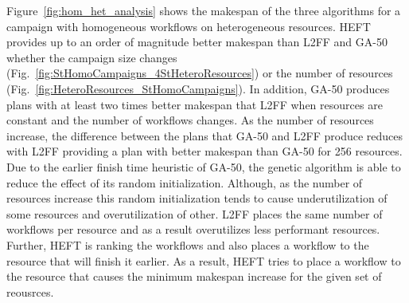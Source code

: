 Figure~\ref{fig:hom_het_analysis} shows the makespan of the three algorithms for a campaign with homogeneous workflows on heterogeneous resources.
HEFT provides up to an order of magnitude better makespan than L2FF and GA-50 whether the campaign size changes (Fig.~\ref{fig:StHomoCampaigns_4StHeteroResources}) or the number of resources (Fig.~\ref{fig:HeteroResources_StHomoCampaigns}).
In addition, GA-50 produces plans with at least two times better makespan that L2FF when resources are constant and the number of workflows changes.
As the number of resources increase, the difference between the plans that GA-50 and L2FF produce reduces with L2FF providing a plan with better makespan than GA-50 for 256 resources.
Due to the earlier finish time heuristic of GA-50, the genetic algorithm is able to reduce the effect of its random initialization.
Although, as the number of resources increase this random initialization tends to cause underutilization of some resources and overutilization of other.
L2FF places the same number of workflows per resource and as a result overutilizes less performant resources.
Further, HEFT is ranking the workflows and also places a workflow to the resource that will finish it earlier.
As a result, HEFT tries to place a workflow to the resource that causes the minimum makespan increase for the given set of reousrces.


